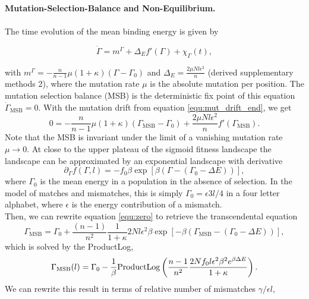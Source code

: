 \textbf{Mutation-Selection-Balance and Non-Equilibrium.}\\ \\
The time evolution of the mean binding energy is given by \cite{held_survival_2019}

\begin{equation}
	\dot{\Gamma}=m^\Gamma+\Delta_E f'(\Gamma)+\chi_\Gamma(t),
\end{equation}

\noindent with $m^\Gamma = -\frac{n}{n-1}\mu(1+\kappa) (\Gamma - \Gamma_0)$ and $\Delta_E = \frac{2\mu Nl\epsilon^2}{n}$ (derived supplementary methods 2), where the mutation rate $\mu$ is the absolute mutation per position. The mutation selection balance (MSB) is the deterministic fix point of this equation $\dot{\Gamma}_{\mathrm{MSB}}=0$. With the mutation drift from equation \ref{equ:mut_drift_end}, we get
\begin{equation}
	0=-\frac{n}{n-1}\mu\left(1+\kappa\right)\left(\Gamma_{\mathrm{MSB}}-\Gamma_0\right)+\frac{2\mu N l \epsilon^2}{n} f'(\Gamma_{\mathrm{MSB}}).
	\label{equ:zero}
\end{equation}
Note that the MSB is invariant under the limit of a vanishing mutation rate $\mu\rightarrow0$. At close to the upper plateau of the sigmoid fitness 
landscape the landscape can be approximated by an exponential landscape with derivative
\begin{equation}
\partial_\Gamma f(\Gamma, l) = -f_0\beta\exp\left[ \beta (\Gamma- (\Gamma_0-\Delta E ))\right],
\end{equation}
where $\Gamma_0$ is the mean energy in a population in the absence of selection. In the model of matches and mismatches, this is simply 
$\Gamma_0=\epsilon 3l/4$ in a four letter alphabet, where $\epsilon$ is the energy contribution of a mismatch.\\
Then, we can rewrite equation \ref{equ:zero} to retrieve the transcendental equation
\begin{equation}
	\Gamma_\mathrm{MSB}=\Gamma_0+\frac{(n-1)}{n^2}\frac{1}{1+\kappa}2Nl\epsilon^2\beta\exp\left[-\beta (\Gamma_\mathrm{MSB} -(\Gamma_0-\Delta E) )\right],
\end{equation}
which is solved by the ProductLog,
\begin{equation}
	\Gamma_\mathrm{MSB}(l)=\Gamma_0 - \frac{1}{\beta}\mathrm{ProductLog}\left(\frac{n-1}{n^2}\frac{ 2N f_0 l \epsilon^2 \beta^2e^{\beta\Delta E}}{1+\kappa}\right)\label{equ:msb_solution}.
\end{equation}
We can rewrite this result in terms of relative number of mismatches $\gamma/\epsilon l$,
